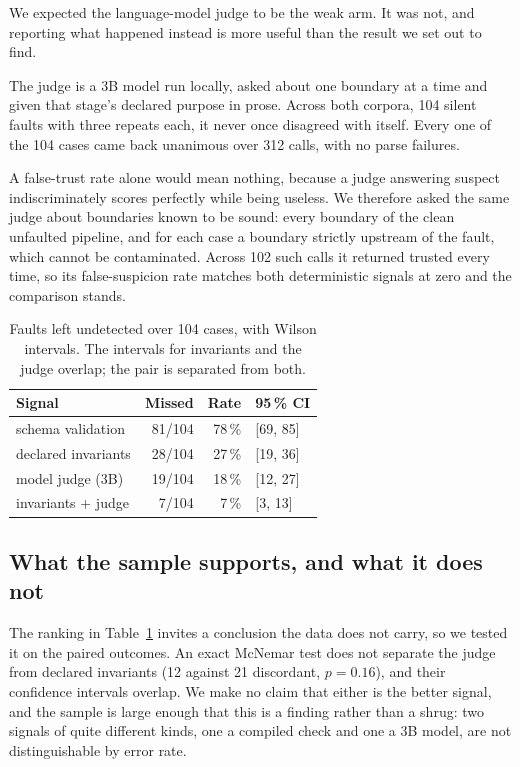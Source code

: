 We expected the language-model judge to be the weak arm. It was not, and reporting what
happened instead is more useful than the result we set out to find.

The judge is a 3B model run locally, asked about one boundary at a time and given that
stage's declared purpose in prose. Across both corpora, 104 silent faults with three
repeats each, it never once disagreed with itself. Every one of the 104 cases came back
unanimous over 312 calls, with no parse failures.

A false-trust rate alone would mean nothing, because a judge answering suspect
indiscriminately scores perfectly while being useless. We therefore asked the same judge
about boundaries known to be sound: every boundary of the clean unfaulted pipeline, and
for each case a boundary strictly upstream of the fault, which cannot be contaminated.
Across 102 such calls it returned trusted every time, so its false-suspicion rate matches
both deterministic signals at zero and the comparison stands.

\begin{table}[t]
\centering
\begin{tabular}{lrrl}
\toprule
Signal & Missed & Rate & 95\,\% CI \\
\midrule
schema validation      & 81/104 & 78\,\% & [69, 85] \\
declared invariants    & 28/104 & 27\,\% & [19, 36] \\
model judge (3B)       & 19/104 & 18\,\% & [12, 27] \\
invariants + judge     &  7/104 &  7\,\% & [3, 13] \\
\bottomrule
\end{tabular}
\caption{Faults left undetected over 104 cases, with Wilson intervals. The intervals for
invariants and the judge overlap; the pair is separated from both.}
\label{tab:signals}
\end{table}

\subsection{What the sample supports, and what it does not}

The ranking in Table~\ref{tab:signals} invites a conclusion the data does not carry, so
we tested it on the paired outcomes. An exact McNemar test does not separate the judge
from declared invariants (12 against 21 discordant, $p=0.16$), and their confidence
intervals overlap. We make no claim that either is the better signal, and the sample is
large enough that this is a finding rather than a shrug: two signals of quite different
kinds, one a compiled check and one a 3B model, are not distinguishable by error rate.

